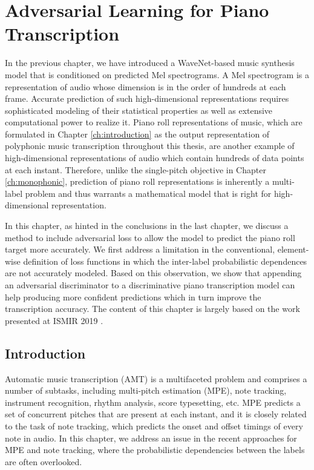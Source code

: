 
\graphicspath{{6-adversarial/figures/}}

\chapter{Adversarial Learning for Piano Transcription}
\label{ch:adversarial}

In the previous chapter, we have introduced a WaveNet-based music synthesis model that is conditioned on predicted Mel spectrograms.
A Mel spectrogram is a representation of audio whose dimension is in the order of hundreds at each frame.
Accurate prediction of such high-dimensional representations requires sophisticated modeling of their statistical properties as well as extensive computational power to realize it.
Piano roll representations of music, which are formulated in Chapter \ref{ch:introduction} as the output representation of polyphonic music transcription throughout this thesis, are another example of high-dimensional representations of audio which contain hundreds of data points at each instant.
Therefore, unlike the single-pitch objective in Chapter \ref{ch:monophonic}, prediction of piano roll representations is inherently a multi-label problem and thus warrants a mathematical model that is right for high-dimensional representation.

In this chapter, as hinted in the conclusions in the last chapter, we discuss a method to include adversarial loss to allow the model to predict the piano roll target more accurately.
We first address a limitation in the conventional, element-wise definition of loss functions in which the inter-label probabilistic dependences are not accurately modeled.
Based on this observation, we show that appending an adversarial discriminator to a discriminative piano transcription model can help producing more confident predictions which in turn improve the transcription accuracy.
The content of this chapter is largely based on the work presented at ISMIR 2019 \cite{kim2019adversarial}.


\section{Introduction}

Automatic music transcription (AMT) is a multifaceted problem and comprises a number of subtasks, including multi-pitch estimation (MPE), note tracking, instrument recognition, rhythm analysis, score typesetting, etc.
MPE predicts a set of concurrent pitches that are present at each instant, and it is closely related to the task of note tracking, which predicts the onset and offset timings of every note in audio.
In this chapter, we address an issue in the recent approaches for MPE and note tracking, where the probabilistic dependencies between the labels are often overlooked.

